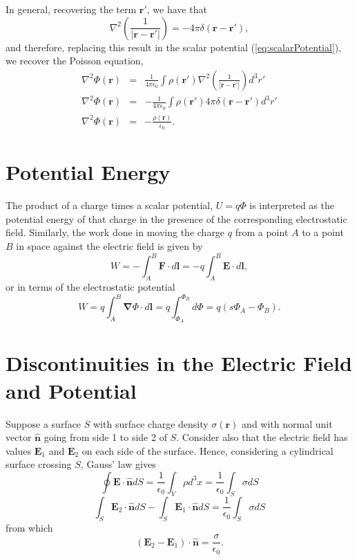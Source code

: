 In general, recovering the term $\textbf{r}'$, we have that 
\begin{equation}
\nabla^2 \left( \frac{1}{\left| \textbf{r} - \textbf{r}' \right|} \right) = -4\pi \delta(\textbf{r} - \textbf{r}'),
\end{equation}
and therefore, replacing this result in the scalar potential (\ref{eq:scalarPotential}), we recover the Poisson equation,
\begin{eqnarray}
\nabla ^2 \Phi (\textbf{r}) &=&  \frac{1}{4\pi \epsilon_0}  \int \rho (\textbf{r}') \nabla^2 \left( \frac{1}{\left| \textbf{r} - \textbf{r}' \right| } \right) d^3r' \\
\nabla ^2 \Phi (\textbf{r}) &=& - \frac{1}{4\pi \epsilon_0}  \int \rho (\textbf{r}') 4\pi \delta(\textbf{r}- \textbf{r}') d^3r' \\
\nabla ^2 \Phi (\textbf{r}) &=& -  \frac{\rho (\textbf{r}) }{\epsilon_0}.
\end{eqnarray}

\section{Potential Energy}
The product of a charge times a scalar potential, $U = q \Phi$ is interpreted as the potential energy of that charge in the presence of the corresponding electrostatic field. Similarly, the work done in moving the charge $q$ from a point $A$ to a point $B$ in space against the electric field is given by
\begin{equation}
W = - \int_A^B \textbf{F} \cdot d\textbf{l} = - q \int_A^B \textbf{E} \cdot d\textbf{l},
\end{equation}
or in terms of the electrostatic potential
\begin{equation}
W =  q \int_A^B \boldsymbol{\nabla} \Phi \cdot d\textbf{l} = q \int_{\Phi_A} ^{\Phi_B} d\Phi = q\left(s \Phi_A - \Phi_B \right).
\end{equation}

\section{Discontinuities in the Electric Field and Potential}

Suppose a surface $S$ with surface charge density $\sigma(\textbf{r})$ and with normal unit vector $\hat{\textbf{n}}$ going from side 1 to side 2 of $S$. Consider also that the electric field has values $\textbf{E}_1$ and $\textbf{E}_2$ on each side of the surface. Hence, considering a cylindrical surface crossing $S$, Gauss' law gives
\begin{equation}
\oint \textbf{E} \cdot \hat{\textbf{n}} dS =\frac{1}{\epsilon_0} \int_V \rho d^3x =\frac{1}{\epsilon_0} \int_S \sigma dS
\end{equation}
\begin{equation}
\int_S \textbf{E}_2 \cdot \hat{\textbf{n}} dS - \int_S \textbf{E}_1 \cdot \hat{\textbf{n}} dS =\frac{1}{\epsilon_0} \int_S \sigma dS
\end{equation}
from which
\begin{equation}
(\textbf{E}_2 -\textbf{E}_1 ) \cdot \hat{\textbf{n}} = \frac{\sigma}{\epsilon_0}. \label{eq:EDiscontinuity}
\end{equation}

